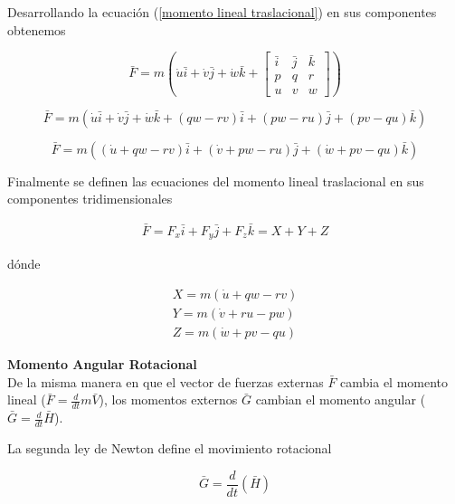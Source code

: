 \medskip

Desarrollando la ecuación (\ref{momento lineal traslacional}) en sus componentes obtenemos

\begin{equation}
    \bar{F} = m(\dot{u}\bar{i}+\dot{v}\bar{j}+\dot{w}\bar{k}+\begin{bmatrix}
    \bar{i} & \bar{j} & \bar{k} \\
    p & q & r \\
    u & v & w
    \end{bmatrix}) 
\end{equation}


\begin{equation}
    \bar{F} = m(\dot{u}\bar{i}+\dot{v}\bar{j}+\dot{w}\bar{k}+
    (qw-rv)\bar{i} + (pw-ru)\bar{j} + (pv-qu)\bar{k}) 
\end{equation}

\begin{equation}
    \bar{F} = m((\dot{u}+qw-rv)\bar{i} + (\dot{v}+pw-ru)\bar{j} + (\dot{w}+pv-qu)\bar{k}) 
\end{equation}

Finalmente se definen las ecuaciones del momento lineal traslacional en sus componentes tridimensionales

\begin{gather}
\label{eq: momento lineal}
    \bar{F} = F_x \bar{i} + F_y \bar{j} + F_z \bar{k} = X + Y + Z 
\end{gather}

dónde

\begin{gather}
\label{eq dinam tras 1}
    X = m(\dot{u} + qw - rv) \\
    Y = m(\dot{v} + ru - pw) \\
    Z = m(\dot{w} + pv - qu)
\label{eq dinam tras 2}
\end{gather}


\medskip
\textbf{Momento Angular Rotacional}\\
De la misma manera en que el vector de fuerzas externas $\bar{F}$ cambia el momento lineal ($\bar{F}=\frac{d}{dt}m\bar{V}$), los momentos externos $\bar{G}$ cambian el momento angular ($\bar{G}=\frac{d}{dt}\bar{H}$).

La segunda ley de Newton define el movimiento rotacional

\begin{equation}
\label{eq: movimiento rotacional}
\bar{G} = \frac{d}{dt}(\bar{H})
\end{equation}

